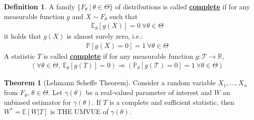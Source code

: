 \documentclass[11pt]{scrartcl}
\newcommand{\R}[0]{\mathbb{R}}
\theoremstyle{definition}
\newtheorem{theorem}{Theorem}
\newtheorem{definition}{Definition}
\theoremstyle{remark}
\newcommand{\dfn}[1]{\textbf{\underline{#1}}}
\newcommand{\pr}[1]{\mathbb{P}\left[#1 \right]}
\newcommand{\EX}[1]{\mathbb{E}\left[#1 \right]}
\newcommand{\EXth}[1]{\mathbb{E}_\theta \left[ #1 \right]}
\newcommand{\prth}[1]{\mathbb{P}_\theta \left[#1 \right]}
\begin{document}
{\begin{definition}
	A family $\{ F_\theta\ |\ \theta \in \Theta \}$ of distributions is called \dfn{complete} if for any measurable function $g$ and $X \sim F_\theta$ such that
	\begin{align*}
		\EXth{g(X)} = 0\ \forall \theta \in \Theta
	\end{align*}
	it holds that $g(X)$ is almost surely zero, i.e.: 
	\begin{align*}
		\pr{g(X) = 0 } = 1\ \forall \theta \in \Theta 
	\end{align*}
	A statistic $T$ is called \dfn{complete} if for any measurable function $g: \mathcal{T} \rightarrow \R$, 
	\begin{align*}
		( \forall \theta \in \Theta,\ \EXth{g(T)} = 0 ) \Rightarrow ( \prth{g(\mathcal{T}) = 0} = 1\ \forall \theta \in \Theta )
	\end{align*}
\end{definition}

\begin{theorem}[Lehmann Scheffe Theorem]
	Consider a random variable $X_1, ..., X_n$ from $F_\theta$, $\theta \in \Theta$. Let $\gamma (\theta)$ be a real-valued parameter of interest and $W$ an unbiased estimator for $\gamma (\theta)$. If $T$ is a complete and sufficient statistic, then $W^* = \EX{W|T}$ is THE UMVUE of $\gamma (\theta)$. 
\end{theorem}

}
\end{document}
